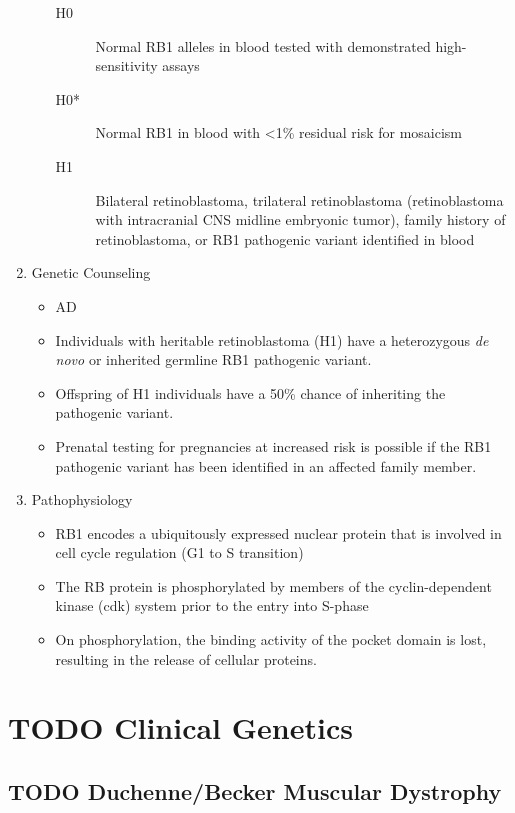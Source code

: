 \documentclass[12pt]{scrartcl}
\begin{document}
\begin{enumerate}
\begin{itemize}
\begin{description}
\item[{H0}] Normal RB1 alleles in blood tested with demonstrated
high-sensitivity assays

\item[{H0*}] Normal RB1 in blood with <1\% residual risk for mosaicism

\item[{H1}] Bilateral retinoblastoma, trilateral retinoblastoma
(retinoblastoma with intracranial CNS midline embryonic
tumor), family history of retinoblastoma, or RB1 pathogenic
variant identified in blood
\end{description}
\end{itemize}

\item Genetic Counseling
\label{sec:org644244b}
\begin{itemize}
\item AD
\item Individuals with heritable retinoblastoma (H1) have a heterozygous
\emph{de novo} or inherited germline RB1 pathogenic variant.
\item Offspring of H1 individuals have a 50\% chance of inheriting the
pathogenic variant.
\item Prenatal testing for pregnancies at increased risk is possible if
the RB1 pathogenic variant has been identified in an affected family
member.
\end{itemize}

\item Pathophysiology
\label{sec:orgeaca153}
\begin{itemize}
\item RB1 encodes a ubiquitously expressed nuclear protein that is
involved in cell cycle regulation (G1 to S transition)
\item The RB protein is phosphorylated by members of the cyclin-dependent kinase
(cdk) system prior to the entry into S-phase
\item On phosphorylation, the binding activity of the pocket domain is
lost, resulting in the release of cellular proteins.
\end{itemize}
\end{enumerate}

\section{{\bfseries\sffamily TODO} Clinical Genetics}
\label{sec:org26076de}
\subsection{{\bfseries\sffamily TODO} Duchenne/Becker Muscular Dystrophy}
\label{sec:org1afe392}
\end{document}

